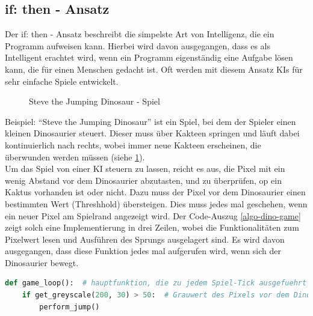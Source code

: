 \subsection{if: then - Ansatz}
Der if: then - Ansatz beschreibt die simpelste Art von Intelligenz, die ein Programm aufweisen kann. Hierbei wird davon ausgegangen, dass es als Intelligent erachtet wird, wenn ein Programm eigenständig eine Aufgabe lösen kann, die für einen Menschen gedacht ist. Oft werden mit diesem Ansatz \glspl{KI} für sehr einfache Spiele entwickelt.

\begin{figure}[htbp]
    \centering
    \caption{\label{fig-trex}Steve the Jumping Dinosaur - Spiel}
\end{figure}

Beispiel: \enquote{Steve the Jumping Dinosaur} ist ein Spiel, bei dem der Spieler einen kleinen Dinosaurier steuert. Dieser muss über Kakteen springen und läuft dabei kontinuierlich nach rechts, wobei immer neue Kakteen erscheinen, die überwunden werden müssen (siehe \cref{fig-trex}).\\
Um das Spiel von einer \gls{KI} steuern zu lassen, reicht es aus, die Pixel mit ein wenig Abstand vor dem Dinosaurier abzutasten, und zu überprüfen, op ein Kaktus vorhanden ist oder nicht. Dazu muss der Pixel vor dem Dinosaurier einen bestimmten Wert (Threshhold) übersteigen. Dies muss jedes mal geschehen, wenn ein neuer Pixel am Spielrand angezeigt wird. Der Code-Auszug \ref{algo-dino-game} zeigt solch eine Implementierung in drei Zeilen, wobei die Funktionalitäten zum Pixelwert lesen und Ausführen des Sprungs ausgelagert sind. Es wird davon ausgegangen, dass diese Funktion jedes mal aufgerufen wird, wenn sich der Dinosaurier bewegt.

\begin{lstlisting}[language=python,
frame=single,
framexleftmargin=15pt,
style=algoBericht,
label={algo-dino-game},
captionpos=b,
caption={Dinosaurier-Spiel KI}]
def game_loop():  # hauptfunktion, die zu jedem Spiel-Tick ausgefuehrt wird
    if get_greyscale(200, 30) > 50:  # Grauwert des Pixels vor dem Dino ueberpruefen
        perform_jump()
\end{lstlisting}

